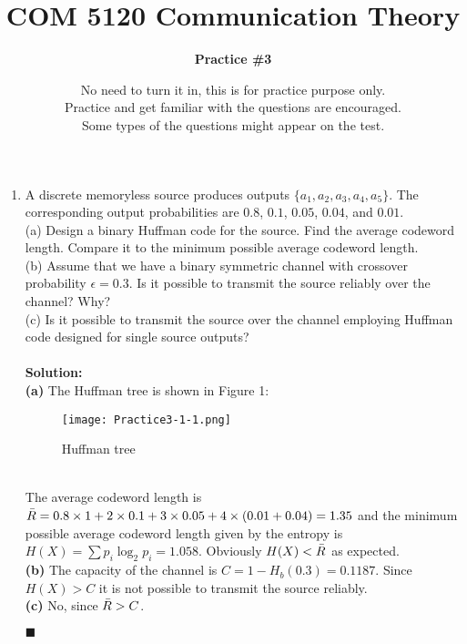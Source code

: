 \documentclass[a4paper,12pt]{article}
\title{\textbf{COM 5120 Communication Theory}}
\author{\textbf{Practice \#3}}
\date{No need to turn it in, this is for practice purpose only.  \\
Practice and get familiar with the questions are encouraged. \\ 
Some types of the questions might appear on the test. \\}
\begin{document}
    \maketitle
    \begin{enumerate}
        \item 
            A discrete memoryless source produces outputs $\{a_1, a_2, a_3, a_4, a_5 \}$. The corresponding output probabilities are $0.8$, $0.1$, $0.05$, $0.04$, and $0.01$. \\
            (a) Design a binary Huffman code for the source. Find the average codeword length. Compare it to the minimum possible average codeword length. \\
            (b) Assume that we have a binary symmetric channel with crossover probability $\epsilon = 0.3$. Is it possible to transmit the source reliably over the channel? Why? \\
            (c) Is it possible to transmit the source over the channel employing Huffman code designed for single source outputs? \\ \\
            \textbf{Solution:} \\
            \textbf{(a)} The Huffman tree is shown in Figure 1: \\ 
            \begin{figure}[h]
            	\centering
            	\texttt{[image: Practice3-1-1.png]}
            	\caption{Huffman tree}
            \end{figure} \\
            The average codeword length is $\Bar{R} = 0.8 \times 1 + 2 \times 0.1+ 3 \times 0.05 + 4 \times (0.01 + 0.04) = 1.35$ and the minimum possible average codeword length given by the entropy is $H(X) = \sum p_i \log_2 p_i = 1.058$. Obviously $H(X) < \Bar{R}$ as expected. \\ 
            \textbf{(b)} The capacity of the channel is $C = 1 - H_b(0.3) = 0.1187$. Since $H(X) > C$ it is not possible to transmit the source reliably. \\
            \textbf{(c)} No, since $\Bar{R} > C$.
            \begin{flushright}
                $\blacksquare$
            \end{flushright}

\end{enumerate}
\end{document}
